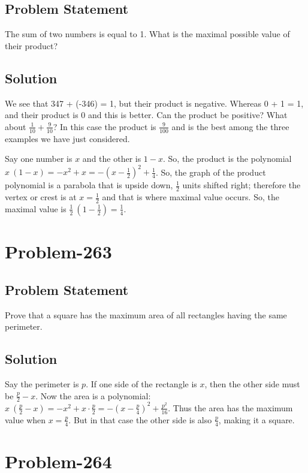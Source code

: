 \documentclass[12pt]{article}
\begin{document}
\subsection*{Problem Statement}
The sum of two numbers is equal to 1. What is the maximal possible value of their product?

\subsection*{Solution}
We see that 347 + (-346) = 1, but their product is negative. Whereas 0 + 1 = 1, and their product is 0 and this is better. Can the product be positive? What about $\frac{1}{10} + \frac{9}{10}$? In this case the product is $\frac{9}{100}$ and is the best among the three examples we have just considered.

Say one number is $x$ and the other is $1-x$. So, the product is the polynomial $x\ (1-x) = -x^2+x = -\left( x - \frac{1}{2} \right)^2 + \frac{1}{4}$. So, the graph of the product polynomial is a parabola that is upside down, $\frac{1}{2}$ units shifted right; therefore the vertex or crest is at $x = \frac{1}{2}$ and that is where maximal value occurs. So, the maximal value is $\frac{1}{2}\ \left( 1 - \frac{1}{2} \right) = \frac{1}{4}$.

\section*{Problem-263}
\subsection*{Problem Statement}
Prove that a square has the maximum area of all rectangles having the same perimeter.

\subsection*{Solution}
Say the perimeter is $p$. If one side of the rectangle is $x$, then the other side must be $\frac{p}{2} - x$. Now the area is a polynomial:  $x\ \left( \frac{p}{2}-x \right) = -x^2 + x\cdot \frac{p}{2} = -\left( x - \frac{p}{4} \right)^2 + \frac{p^2}{16}$. Thus the area has the maximum value when $x = \frac{p}{4}$. But in that case the other side is also $\frac{p}{4}$, making it a square.

\section*{Problem-264}
\end{document}
